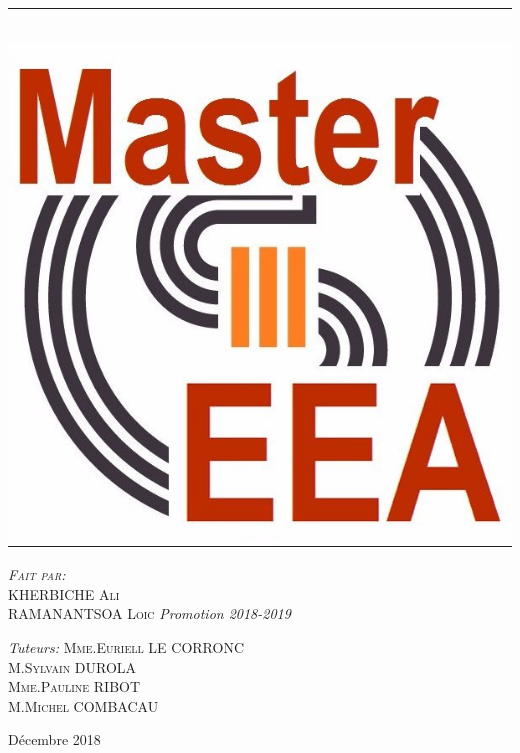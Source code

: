\documentclass[12pt, a4paper, openany]{report}
\newcommand{\HRule}{\rule{\linewidth}{0.5mm}}
\begin{document}
\begin{titlepage}
\begin{sffamily}
\begin{center}
    \HRule \\[1cm]   %
    \includegraphics[scale=0.1]{logomaster.jpg}
    \\[1cm]
    \begin{minipage}{0.4\textwidth}
      \begin{flushleft} \large
         \textsc{\emph {Fait par:} \\KHERBICHE Ali\\ RAMANANTSOA Loic}  
          \newline
          \emph{Promotion 2018-2019 } \\
      \end{flushleft}
    \end{minipage}
    \begin{minipage}{0.4\textwidth}
      \begin{flushright} \large
        \emph{Tuteurs:} \textsc{Mme.Euriell LE CORRONC\\M.Sylvain DUROLA\\Mme.Pauline RIBOT\\M.Michel COMBACAU}
      \end{flushright}
    \end{minipage}
    \vfill
    {\large Décembre 2018}
  \end{center}
  \end{sffamily}                
  \end{titlepage}  
\makeatother
\end{document}
